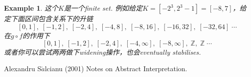 \documentclass{article}
\newtheorem{example}[theorem]{Example}
\begin{document}
\begin{example}
这个$K$是一个finite set. 例如给定$K = [-2^3, 2^3-1] = [-8,7]$，给定下面区间包含关系下的升链
$$
[0, 1],\;[-1,2],\;[-2,4],\;[-4,8],\;[-8,16],\;[-16,32],\;[-32,64]\;\cdots
$$
在$g \circ f$的作用下
$$
[0, 1],\;[-1,2],\;[-2,4],\;[-4,\infty],\;[-8,\infty],\;\mathbb{Z},\;\mathbb{Z}\;\cdots
$$
或者你可以尝试两两做下widening操作，也会eventually stabilises.
\end{example}


\begin{thebibliography}{9}
Alexandru S$\breve{a}$lcianu (2001) Notes on Abstract Interpretation.
\end{thebibliography}
\end{document}

